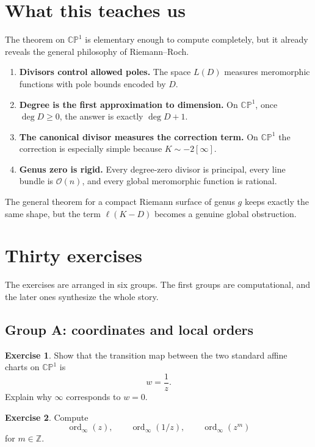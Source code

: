 \documentclass[11pt]{article}
\newcommand{\CP}{\mathbb{CP}}
\newcommand{\OO}{\mathcal{O}}
\newcommand{\ord}{\operatorname{ord}}
\newcommand{\degd}{\operatorname{deg}}
\newcommand{\ellD}{\ell}
\newcommand{\CPone}{\CP^1}
\theoremstyle{definition}
\newtheorem{exercise}{Exercise}[section]
\theoremstyle{plain}
\begin{document}
\section{What this teaches us}
The theorem on $\CPone$ is elementary enough to compute completely, but it already reveals the general philosophy of Riemann--Roch.

\begin{enumerate}[label=\arabic*., leftmargin=2em]
    \item \textbf{Divisors control allowed poles.} The space $L(D)$ measures meromorphic functions with pole bounds encoded by $D$.
    \item \textbf{Degree is the first approximation to dimension.} On $\CPone$, once $\degd D\ge 0$, the answer is exactly $\degd D+1$.
    \item \textbf{The canonical divisor measures the correction term.} On $\CPone$ the correction is especially simple because $K\sim -2[\infty]$.
    \item \textbf{Genus zero is rigid.} Every degree-zero divisor is principal, every line bundle is $\OO(n)$, and every global meromorphic function is rational.
\end{enumerate}

The general theorem for a compact Riemann surface of genus $g$ keeps exactly the same shape, but the term $\ellD(K-D)$ becomes a genuine global obstruction.

\section{Thirty exercises}
The exercises are arranged in six groups. The first groups are computational, and the later ones synthesize the whole story.

\subsection{Group A: coordinates and local orders}
\begin{exercise}
Show that the transition map between the two standard affine charts on $\CPone$ is
\[
w=\frac{1}{z}.
\]
Explain why $\infty$ corresponds to $w=0$.
\end{exercise}

\begin{exercise}
Compute
\[
\ord_{\infty}(z),\qquad \ord_{\infty}(1/z),\qquad \ord_{\infty}(z^m)
\]
for $m\in \mathbb Z$.
\end{exercise}
\end{document}
